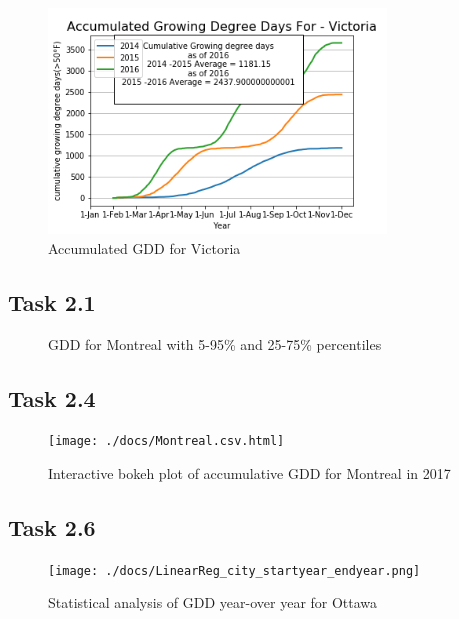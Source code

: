 \documentclass[12pt]{article}
\begin{document}
\begin{figure}[!htbp]
\centering
\includegraphics[width=0.8\textwidth]{./docs/VictoriaGDD.png} 
\caption{\scriptsize Accumulated GDD for Victoria}
\label{accuGDD_3}		  
\end{figure}	

\pagebreak 	

\subsection{Task 2.1}
\begin{figure}[!htbp]
\centering
\caption{\scriptsize GDD for Montreal with 5-95\% and 25-75\% percentiles}
\label{GDDwCI}		  
\end{figure}

\subsection{Task 2.4}
\begin{figure}[!htbp]
\centering
\texttt{[image: ./docs/Montreal.csv.html]} 
\caption{\scriptsize Interactive bokeh plot of accumulative GDD for Montreal in 2017}
\label{bokeh}		  
\end{figure}


\subsection{Task 2.6}
\begin{figure}[!htbp]
\centering
\texttt{[image: ./docs/LinearReg\_city\_startyear\_endyear.png]} 
\caption{\scriptsize Statistical analysis of GDD year-over year for Ottawa}
\label{GDDregression}		  
\end{figure}

\pagebreak
\end{document}
